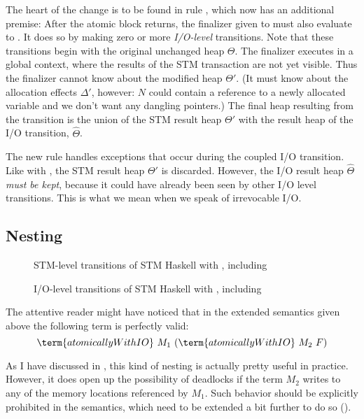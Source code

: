 The heart of the change is to be found in rule , which now has an additional premise:
After the atomic block returns, the finalizer given to  must also evaluate to .
It does so by making zero or more \emph{I/O-level} transitions.
Note that these transitions begin with the original unchanged heap $\Theta$.
The finalizer executes in a global context, where the results of the STM transaction are not yet visible.
Thus the finalizer cannot know about the modified heap $\Theta'$.
(It must know about the allocation effects $\Delta'$, however:
$N$ could contain a reference to a newly allocated variable and we don't want any dangling pointers.)
The final heap resulting from the  transition is the union of the STM result heap $\Theta'$ with the result heap of the I/O transition, $\hat{\Theta}$.

The new rule  handles exceptions that occur during the coupled I/O transition.
Like with , the STM result heap $\Theta'$ is discarded.
However, the I/O result heap $\hat{\Theta}$ \emph{must be kept}, because it could have already been seen by other I/O level transitions.
This is what we mean when we speak of irrevocable I/O.


\subsection{Nesting}

\begin{figure}

\caption{STM-level transitions of STM Haskell with , including }
\label{fig:step2-stm}
\end{figure}

\begin{figure}

\caption{I/O-level transitions of STM Haskell with , including }
\label{fig:step2-io}
\end{figure}

The attentive reader might have noticed that in the extended semantics given above the following term is perfectly valid:
$$
\term{atomicallyWithIO}\ M_1\ (\term{atomicallyWithIO}\ M_2\ F)
$$

As I have discussed in , this kind of nesting is actually pretty useful in practice.
However, it does open up the possibility of deadlocks if the term $M_2$ writes to any of the memory locations referenced by $M_1$.
Such behavior should be explicitly prohibited in the semantics, which need to be extended a bit further to do so ().

